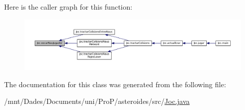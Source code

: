 Here is the caller graph for this function\+:\nopagebreak
\begin{figure}[H]
\begin{center}
\leavevmode
\includegraphics[width=350pt]{class_joc_a471c58ad94b7a8732a6b3e4695f2a691_icgraph}
\end{center}
\end{figure}




The documentation for this class was generated from the following file\+:\begin{DoxyCompactItemize}
\item 
/mnt/\+Dades/\+Documents/uni/\+Pro\+P/asteroides/src/\hyperlink{_joc_8java}{Joc.\+java}\end{DoxyCompactItemize}
